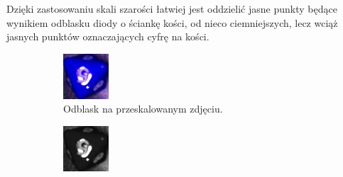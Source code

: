 Dzięki zastosowaniu skali szarości łatwiej jest oddzielić jasne punkty będące wynikiem odblasku diody o ściankę kości,
od nieco ciemniejszych, lecz wciąż jasnych punktów oznaczających cyfrę na kości.

\begin{figure}[H]
    \centering
    \begin{subfigure}[t]{0.45\linewidth}
        \centering
        \includegraphics[width=\linewidth]{chapters/04-czytanie/figures/blask_raw}
        \caption{Odblask na przeskalowanym zdjęciu.}
        \label{fig:blaskraw}
    \end{subfigure}
    \hfill
    \begin{subfigure}[t]{0.45\linewidth}
        \centering
        \includegraphics[width=\linewidth]{chapters/04-czytanie/figures/blask_proc}

\end{subfigure}
\end{figure}
